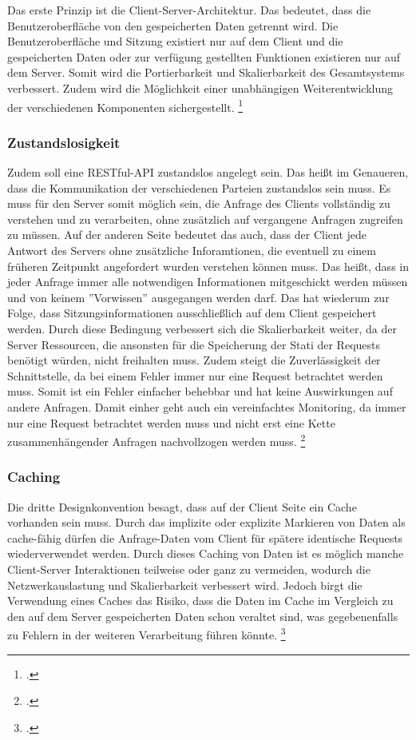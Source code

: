 Das erste Prinzip ist die Client-Server-Architektur. Das bedeutet, dass die Benutzeroberfläche von den gespeicherten Daten getrennt wird. Die Benutzeroberfläche und Sitzung existiert nur auf dem Client und die gespeicherten Daten oder zur verfügung gestellten Funktionen existieren nur auf dem Server. Somit wird die Portierbarkeit und Skalierbarkeit des Gesamtsystems verbessert. Zudem wird die Möglichkeit einer unabhängigen Weiterentwicklung der verschiedenen Komponenten sichergestellt. \footcite[Vgl.][]{fielding_architectural_2000}

\subsubsection{Zustandslosigkeit}

Zudem soll eine RESTful-API zustandslos angelegt sein. Das hei{\ss}t im Genaueren, dass die Kommunikation der verschiedenen Parteien zustandslos sein muss. Es muss für den Server somit möglich sein, die Anfrage des Clients vollständig zu verstehen und zu verarbeiten, ohne zusätzlich auf vergangene Anfragen zugreifen zu müssen. Auf der anderen Seite bedeutet das auch, dass der Client jede Antwort des Servers ohne zusätzliche Inforamtionen, die eventuell zu einem früheren Zeitpunkt angefordert wurden verstehen können muss. Das hei{\ss}t, dass in jeder Anfrage immer alle notwendigen Informationen mitgeschickt werden müssen und von keinem ''Vorwissen'' ausgegangen werden darf. Das hat wiederum zur Folge, dass Sitzungsinformationen ausschlie{\ss}lich auf dem Client gespeichert werden. Durch diese Bedingung verbessert sich die Skalierbarkeit weiter, da der Server Ressourcen, die ansonsten für die Speicherung der Stati der Requests benötigt würden, nicht freihalten muss. Zudem steigt die Zuverlässigkeit der Schnittstelle, da bei einem Fehler immer nur eine Request betrachtet werden muss. Somit ist ein Fehler einfacher behebbar und hat keine Auswirkungen auf andere Anfragen. Damit einher geht auch ein vereinfachtes Monitoring, da immer nur eine Request betrachtet werden muss und nicht erst eine Kette zusammenhängender Anfragen nachvollzogen werden muss. \footcite[Vgl.][]{fielding_architectural_2000}

\subsubsection{Caching}

Die dritte Designkonvention besagt, dass auf der Client Seite ein Cache vorhanden sein muss. Durch das implizite oder explizite Markieren von Daten als cache-fähig dürfen die Anfrage-Daten vom Client für spätere identische Requests wiederverwendet werden. Durch dieses Caching von Daten ist es möglich manche Client-Server Interaktionen teilweise oder ganz zu vermeiden, wodurch die Netzwerkauslastung und Skalierbarkeit verbessert wird. Jedoch birgt die Verwendung eines Caches das Risiko, dass die Daten im Cache im Vergleich zu den auf dem Server gespeicherten Daten schon veraltet sind, was gegebenenfalls zu Fehlern in der weiteren Verarbeitung führen könnte. \footcite[Vgl.][]{fielding_architectural_2000}


